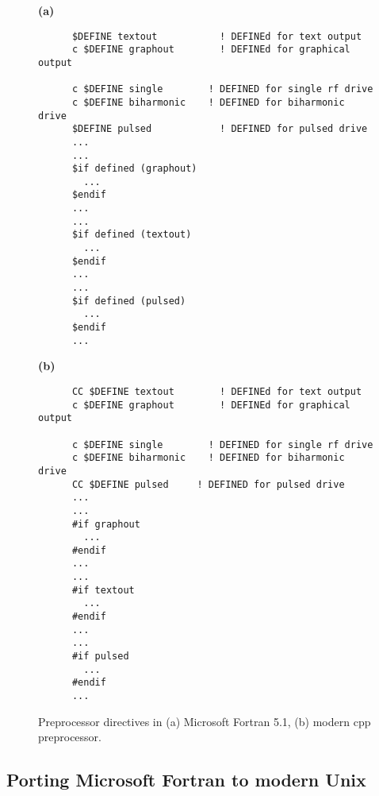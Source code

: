 \begin{supplement}
\begin{figure}[h]
\begin{minipage}{0.75\textwidth}
\textbf{(a)}
\begin{lstlisting}
      $DEFINE textout			! DEFINEd for text output
      c $DEFINE graphout		! DEFINEd for graphical output
      
      c $DEFINE single        ! DEFINED for single rf drive
      c $DEFINE biharmonic    ! DEFINED for biharmonic drive
      $DEFINE pulsed			! DEFINED for pulsed drive
      ...
      ...
      $if defined (graphout)
      	...
      $endif
      ...
      ...
      $if defined (textout)
      	...
      $endif
      ...
      ...
      $if defined (pulsed)
      	...
      $endif
      ...

\end{lstlisting}
\end{minipage}
%
\hfill
%
\begin{minipage}{0.75\textwidth}
\textbf{(b)}
\begin{lstlisting}
      CC $DEFINE textout		! DEFINEd for text output
      c $DEFINE graphout		! DEFINEd for graphical output
      
      c $DEFINE single        ! DEFINED for single rf drive
      c $DEFINE biharmonic    ! DEFINED for biharmonic drive
      CC $DEFINE pulsed		! DEFINED for pulsed drive
      ...
      ...
      #if graphout
      	...
      #endif
      ...
      ...
      #if textout
      	...
      #endif
      ...
      ...
      #if pulsed
      	...
      #endif
      ...

\end{lstlisting}
\end{minipage}

\caption{Preprocessor directives in (a) Microsoft Fortran 5.1, (b) modern \textsf{cpp} preprocessor.}
\label{fig:preprocessor}
\end{figure}



\clearpage
\subsection{Porting Microsoft Fortran to modern Unix}

\begin{figure}[h]
\centering


\end{figure}
\end{supplement}
